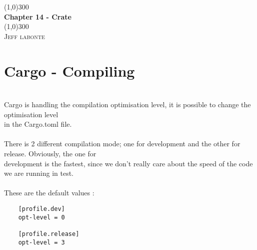\documentclass{article}
\begin{document}
  \begin{titlepage}
    \begin{center}
      \line(1,0){300} \\
      [0.25in]
      \huge{\bfseries Chapter 14 - Crate}\\
      [2mm]
      \line(1,0){300}\\
      [1.5cm]
      \textsc{\LARGE Jeff labonte}\\
      [0.75cm]
    \end{center}
  \end{titlepage}
  \section {Cargo - Compiling}
  \ \\[2mm]
  Cargo is handling the compilation optimisation level, it is possible to change the optimisation level \\
  in the Cargo.toml file. \\
  \ \\[2mm]
  There is 2 different compilation mode; one for development and the other for release. Obviously, the one for\\
  development is the fastest, since we don't really care about the speed of the code we are running in test. \\
  \ \\[2mm]
  These are the default values :
  \begin{lstlisting}
    [profile.dev]
    opt-level = 0

    [profile.release]
    opt-level = 3
  \end{lstlisting}
\end{document}
